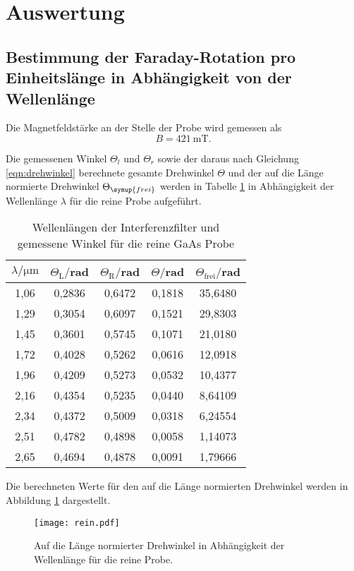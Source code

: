 \section{Auswertung}
\label{sec:Auswertung}
\subsection{Bestimmung der Faraday-Rotation pro Einheitslänge in Abhängigkeit von der Wellenlänge}
Die Magnetfeldstärke an der Stelle der Probe wird gemessen als
\begin{equation*}
  B = \SI{421}{\milli\tesla}.
\end{equation*}

Die gemessenen Winkel $\Theta_l$ und $\Theta_r$ sowie der daraus nach Gleichung
\ref{eqn:drehwinkel} berechnete gesamte Drehwinkel $\Theta$ und der auf die Länge
normierte Drehwinkel $\Theta_\symup{frei}$ werden in Tabelle \ref{tab:rein} in Abhängigkeit
der Wellenlänge $\lambda$ für die reine Probe aufgeführt.

\begin{table}[H]
  \centering
  \caption{Wellenlängen der Interferenzfilter und gemessene Winkel für die reine GaAs Probe}
  \label{tab:rein}
  \begin{tabular}{c c c c c}
    \toprule
    $\lambda/\mathrm{\mu m}$ & $\Theta_{\mathrm{L}}/$rad & $\Theta_{\mathrm{R}}/$rad  & $\Theta /$rad & $\Theta_{\mathrm{frei}}/$rad\\
    \midrule
    1,06  & 0,2836 & 0,6472 & 0,1818 & 35,6480 \\
    1,29  & 0,3054 & 0,6097 & 0,1521 & 29,8303 \\
    1,45  & 0,3601 & 0,5745 & 0,1071 & 21,0180 \\
    1,72  & 0,4028 & 0,5262 & 0,0616 & 12,0918 \\
    1,96  & 0,4209 & 0,5273 & 0,0532 & 10,4377 \\
    2,16  & 0,4354 & 0,5235 & 0,0440 & 8,64109 \\
    2,34  & 0,4372 & 0,5009 & 0,0318 & 6,24554 \\
    2,51  & 0,4782 & 0,4898 & 0,0058 & 1,14073 \\
    2,65  & 0,4694 & 0,4878 & 0,0091 & 1,79666 \\
    \bottomrule
  \end{tabular}
\end{table}



Die berechneten Werte für den auf die Länge normierten Drehwinkel werden
in Abbildung \ref{fig:rein} dargestellt.
\begin{figure}[H]
  \centering
  \texttt{[image: rein.pdf]}
  \caption{Auf die Länge normierter Drehwinkel in Abhängigkeit der Wellenlänge für die reine Probe.}
  \label{fig:rein}
\end{figure}

